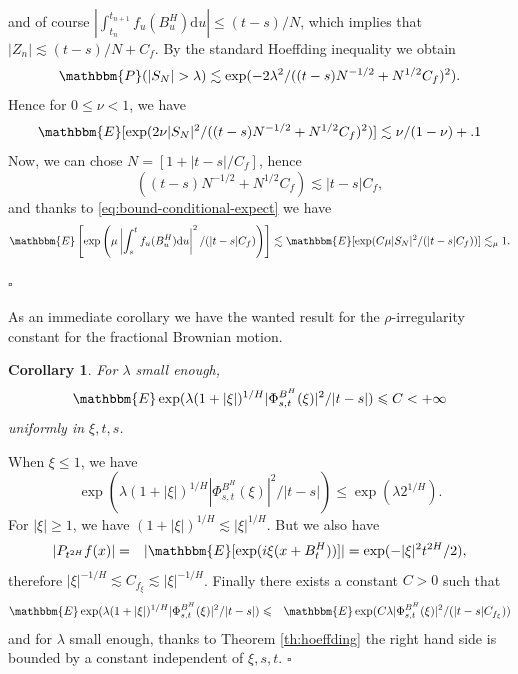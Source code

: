 \documentclass[a4paper,11pt]{article}
\newcommand{\mathd}{\mathrm{d}}
\newcommand{\nosymbol}{}
\newtheorem{corollary}[theorem]{Corollary}
\newenvironment{proof}{{\sc Proof.}}{\hfill$\square$}
\begin{document}
\begin{proof}
  and of course $| \int_{t_{n}^{\nosymbol}}^{t_{n+1}} f_{u} ( B^{H}_{u} )
  \mathd u| \leqslant ( t-s ) /N$, which implies that $| Z_{n} | \lesssim ( t-s
  ) /N+C_{f}$. By the standard Hoeffding inequality we obtain
  \[  \mathbbm{P} ( | S_{N} | > \lambda ) \lesssim \exp ( -2 \lambda^{2} / (
     ( t-s ) N^{-1/2} +N^{1/2} C_{f} )^{2} ). \]
  Hence for $0 \leqslant \nu <1$, we have
  \[ \mathbbm{E} [ \exp ( 2 \nu | S_{N} |^{2} / ( ( t-s ) N^{-1/2} +N^{1/2}
     C_{f} )^{2} ) ] \lesssim \nu / ( 1- \nu ) +.1 \]
  Now, we can chose $N= [ 1+ | t-s | /C_{f} ]$, hence
  \[ ( ( t-s ) N^{-1/2} +N^{1/2} C_{f} ) \lesssim | t-s | C_{f} , \]
  and thanks to {\eqref{eq:bound-conditional-expect}} we have
  \[ \mathbbm{E} \left[ \exp \left( \mu \left\lvert \int_{s}^{t} f_{u} ( B^{H}_{u}
     ) \mathd u \right\lvert^{2} / ( | t-s | C_{f} ) \right) \right] \lesssim
     \mathbbm{E} [ \exp ( C \mu | S_{N} |^{2} / ( | t-s | C_{f} ) ) ]
     \lesssim_{\mu} 1.  \]
  
\end{proof}

As an immediate corollary we have the wanted result for the
$\rho$-irregularity constant for the fractional Brownian motion.

\begin{corollary}
  \label{cor:irr-fbm}For $\lambda$ small enough,
  \[ \mathbbm{E}  \exp ( \lambda ( 1+ | \xi | )^{1/H} | \Phi_{s,t}^{B^{H}} (
     \xi ) |^{2} / | t-s | ) \leqslant C<+ \infty \]
  uniformly in $\xi ,t,s$. 
\end{corollary}

\begin{proof}
  When $\xi \leqslant 1$, we have
  \[ \exp ( \lambda ( 1+ | \xi | )^{1/H} | \Phi^{B^{H}}_{s,t} ( \xi ) |^{2} /
     | t-s | ) \leqslant \exp ( \lambda 2^{1/H} ) . \]
  For $| \xi | \geqslant 1$, we have $ ( 1+ | \xi | )^{1/H} \lesssim
  | \xi |^{1/H}$. But we also have
  \begin{eqnarray*}
    | P_{t^{2H}} f ( x ) | & = & | \mathbbm{E} [ \exp ( i \xi ( x+B^{H}_{t} )
    ) ] |
    =  \exp ( - | \xi |^{2} t^{2H} /2 ) ,
  \end{eqnarray*}
  therefore
  $ |\xi|^{-1/H}\lesssim C_{f_{\xi}} \lesssim | \xi |^{-1/H} $. 
  Finally there exists a constant $C>0$ such that
  \begin{eqnarray*}
    \mathbbm{E}  \exp ( \lambda ( 1+ | \xi | )^{1/H} | \Phi_{s,t}^{B^{H}} (
    \xi ) |^{2} / | t-s | ) & \leqslant & \mathbbm{E}  \exp ( C \lambda |
    \Phi_{s,t}^{B^{H}} ( \xi ) |^{2} / ( | t-s | C_{f_{\xi}} ) )
  \end{eqnarray*}
  and for $\lambda$ small enough, thanks to Theorem \ref{th:hoeffding} the right hand side
  is bounded by a constant independent of $\xi ,s,t$.
\end{proof}
\end{document}
